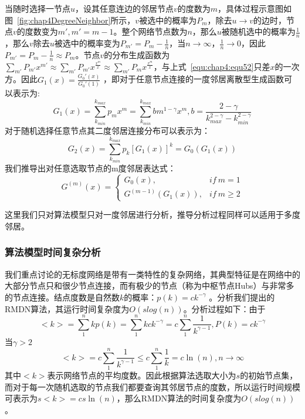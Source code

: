 
当随时选择一节点$u$，设其任意连边的邻居节点$v$的度数为$m$，具体过程示意图如图~\ref{fig:chap4DegreeNeighbor}所示，$v$被选中的概率为$P_m$，除去$u\to v$的边时，节点$v$的度数变为$m',m'= m-1$。整个网络节点数为$n$，那么$u$被随机选中的概率为$\frac{1}{n}$，那么$v$除去$u$被选中的概率变为$P_{m'}=P_m-\frac{1}{n}$，当$n\to \infty $，$\frac{1}{n} \to 0$，因此$P_{m'}=P_m-\frac{1}{n} \approx P_m$。节点$v$的分布生成函数为$\sum_{m'}P_{m'}x^{m'} \approx \sum_{m'}P_{m'}x^{\frac{x^m}{x}} \approx \sum_{m'}P_{m}x^{\frac{x^m}{x}} $，与上式~\ref{equ:chap4:equ52}只差$x$的一次方。因此$G_1(x)=\frac{G_0'(x)}{G_0'(1)}$
，即对于任意节点连接的一度邻居离散型生成函数可以表示为:
\begin{equation}
\label{equ:chap4:equ8}
G_{1}(x) = \sum_{k_{min}}^{k_{max}}p_{m}x^{m} = \sum_{k_{min}}^{k_{max}}bm^{1-\gamma}x^{m}, b = \frac{2-\gamma}{k_{max}^{2-\gamma}-k_{min}^{2-\gamma}}
\end{equation}
对于随机选择任意节点其二度邻居连接分布可以表示为：
\begin{equation}
\label{equ:chap4:equ9}
G_{2}(x) = \sum_{k_{min}}^{k_{max}}p_{k}{[G_{1}(x)]}^{k} = G_{0}(G_{1}(x))
\end{equation}
我们推导出对任意选取节点的m度邻居表达式：
\begin{equation}
\label{equ:chap4:equ10}
G^{(m)}(x) = 
\begin{cases} 
G_{0}(x), & if ~ m = 1 \\
G^{(m-1)}(G_{1}(x)), & if ~ m \geq 2
\end{cases}
\end{equation}

这里我们只对算法模型只对一度邻居进行分析，推导分析过程同样可以适用于多度邻居。
\subsubsection{算法模型时间复杂分析}
我们重点讨论的无标度网络是带有一类特性的复杂网络，其典型特征是在网络中的大部分节点只和很少节点连接，而有极少的节点（称为中枢节点Hubs）与非常多的节点连接。结点度数是自然数$k$的概率：$p(k) = ck^{-\gamma}$ \cite{cohen2003efficient}。分析我们提出的RMDN算法，其运行时间复杂度为$O(slog(n))$。分析过程如下：由于
\begin{equation}
<k>=\sum_ {1}^{n}kp(k)=\sum_{1}^{n}kck^{-\gamma}=c\sum_{1}^{n}\frac{1}{k^{\gamma -1}},P(k)=ck^{-\gamma}
\end{equation}
当$\gamma >2$
\begin{equation}
<k>=c\sum_{1}^{n}\frac{1}{k^{\gamma -1}} \le c\sum\limits_{1}^{n}\frac{1}{k}=c\ln (n),n\to \infty
\end{equation}
其中$<k>$表示网络节点的平均度数。因此根据算法选取大小为$s$的初始节点集，而对于每一次随机选取的节点我们都要查询其邻居节点的度数，所以运行时间规模可表示为$s<k>=cs\ln (n)$，那么RMDN算法的时间复杂度为$O(slog(n))$。

